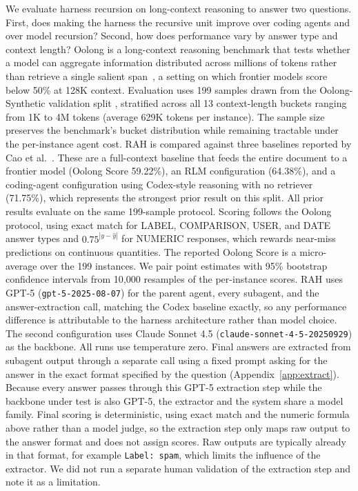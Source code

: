 \documentclass[sigconf,nonacm]{acmart}
\begin{document}
We evaluate harness recursion on long-context reasoning to answer two questions. First,
does making the harness the recursive unit improve over coding agents and over model
recursion? Second, how does performance vary by answer type and context length?
Oolong is a long-context reasoning benchmark that tests whether a model can aggregate
information distributed across millions of tokens rather than retrieve a single salient
span~\cite{bertsch2025oolong}, a setting on which frontier models score below 50\% at 128K
context. Evaluation uses 199 samples drawn from the Oolong-Synthetic validation split
\cite{cao2026oolong}, stratified across all 13 context-length buckets ranging
from 1K to 4M tokens (average 629K tokens per instance).
The sample size preserves the benchmark's bucket distribution while remaining
tractable under the per-instance agent cost.
RAH is compared against three baselines reported by Cao et al.~\cite{cao2026oolong}. These are a
full-context baseline that feeds the entire document to a frontier model
(Oolong Score 59.22\%), an RLM configuration (64.38\%), and a coding-agent
configuration using Codex-style reasoning with no retriever (71.75\%), which
represents the strongest prior result on this split. All prior results evaluate on the same 199-sample protocol.
Scoring follows the Oolong protocol, using exact match for LABEL, COMPARISON, USER,
and DATE answer types and $0.75^{|y - \hat{y}|}$ for NUMERIC responses, which
rewards near-miss predictions on continuous quantities. The reported Oolong Score is a
micro-average over the 199 instances. We pair point estimates with 95\% bootstrap
confidence intervals from 10{,}000 resamples of the per-instance scores.
RAH uses GPT-5 (\texttt{gpt-5-2025-08-07}) for the parent agent, every subagent, and the
answer-extraction call, matching the Codex baseline exactly, so any performance difference
is attributable to the harness architecture rather than model choice. The second
configuration uses Claude Sonnet 4.5 (\texttt{claude-sonnet-4-5-20250929}) as the backbone.
All runs use temperature zero. Final answers are extracted from subagent output through a
separate call using a fixed prompt asking for the answer in the exact format specified by
the question (Appendix~\ref{app:extract}). Because every answer passes through this GPT-5 extraction step while the
backbone under test is also GPT-5, the extractor and the system share a model family. Final
scoring is deterministic, using exact match and the numeric formula above rather than a model
judge, so the extraction step only maps raw output to the answer format and does not assign
scores. Raw outputs are typically already in that format, for example \texttt{Label: spam},
which limits the influence of the extractor. We did not run a separate human validation of the
extraction step and note it as a limitation.
\end{document}
